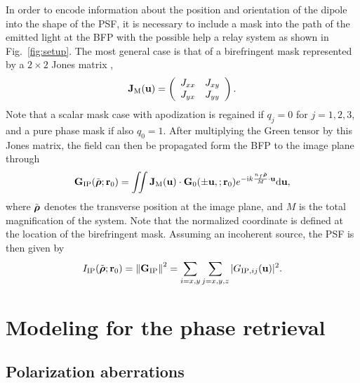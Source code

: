 \documentclass[reprint,aps,pra,superscriptaddress,
amsmath,amssymb]{revtex4-1}
\begin{document}
In order to encode information about the position and orientation of the 
dipole into the shape of the PSF, it is necessary to include a mask into the 
path of the emitted light at the BFP with the possible help a relay system 
as shown in Fig.~\ref{fig:setup}. 
The most general case is that of a 
birefringent mask represented by a $2\times 2$ Jones matrix \cite{},
\begin{align} \label{eq:jqw}
\textbf J_\text{M}(\textbf u) =  \left(
\begin{array}{cc}
J_{xx}&J_{xy} \\
J_{yx} & J_{yy}
\end{array}
\right).
\end{align}
Note that a scalar mask case with apodization is regained if $q_j=0$ 
for $j=1,2,3$, and a pure phase mask if also $q_0 =1$.
After multiplying the Green tensor by this Jones matrix, the field  can then 
be propagated form the BFP to the image plane through
\begin{align}
\textbf G_\text{IP} (\tilde{\boldsymbol \rho}; \textbf r_0 ) = \iint  \textbf J_\text{M}(\textbf u)  
\cdot \textbf G_0  (\pm \textbf u,; \textbf r_0) e^{- \text{i} k  \frac{n_f \tilde{\boldsymbol \rho}}{M}  \cdot \textbf u } \mathrm{d} \textbf u ,
\end{align}
where $\tilde{\boldsymbol \rho}$ denotes the transverse position at the image plane, and
$M$ is the total magnification of the system. 
Note that the normalized coordinate is defined at the location of the birefringent  mask.
Assuming an incoherent source, the PSF is then given by
\begin{align}
  I_\text{IP} (\tilde{\boldsymbol \rho}; \textbf r_0) =  \left\lVert\textbf G_\text{IP} \right\rVert^2 
  = \sum_{i=x,y} \sum_{j=x,y,z} |G_{\text{IP},ij}( \textbf u)|^2.
\end{align}

\section{Modeling for the phase retrieval}

\subsection{Polarization aberrations}
\end{document}
